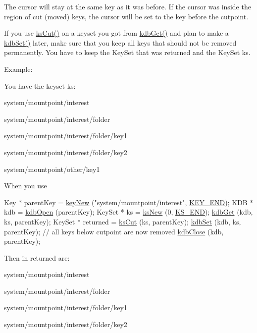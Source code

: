 The cursor will stay at the same key as it was before. If the cursor was inside the region of cut (moved) keys, the cursor will be set to the key before the cutpoint.

If you use \hyperlink{group__keyset_ga6b00cf82b59af4d883a9bad6cf4a4a4a}{ks\+Cut()} on a keyset you got from \hyperlink{group__kdb_ga28e385fd9cb7ccfe0b2f1ed2f62453a1}{kdb\+Get()} and plan to make a \hyperlink{group__kdb_ga11436b058408f83d303ca5e996832bcf}{kdb\+Set()} later, make sure that you keep all keys that should not be removed permanently. You have to keep the Key\+Set that was returned and the Key\+Set {\ttfamily ks}.

\begin{DoxyParagraph}{Example\+:}

\end{DoxyParagraph}
You have the keyset {\ttfamily ks\+:} 
\begin{DoxyItemize}
\item {\ttfamily system/mountpoint/interest} 
\item {\ttfamily system/mountpoint/interest/folder} 
\item {\ttfamily system/mountpoint/interest/folder/key1} 
\item {\ttfamily system/mountpoint/interest/folder/key2} 
\item {\ttfamily system/mountpoint/other/key1} 
\end{DoxyItemize}

When you use 
\begin{DoxyCodeInclude}
        Key * parentKey = \hyperlink{group__key_gad23c65b44bf48d773759e1f9a4d43b89}{keyNew} (\textcolor{stringliteral}{"system/mountpoint/interest"}, \hyperlink{group__key_gga91fb3178848bd682000958089abbaf40aa8adb6fcb92dec58fb19410eacfdd403}{KEY\_END});
        KDB * kdb = \hyperlink{group__kdb_ga6808defe5870f328dd17910aacbdc6ca}{kdbOpen} (parentKey);
        KeySet * ks = \hyperlink{group__keyset_ga671e1aaee3ae9dc13b4834a4ddbd2c3c}{ksNew} (0, \hyperlink{kdbenum_8c_a7a28fce3773b2c873c94ac80b8b4cd54}{KS\_END});
        \hyperlink{group__kdb_ga28e385fd9cb7ccfe0b2f1ed2f62453a1}{kdbGet} (kdb, ks, parentKey);
        KeySet * returned = \hyperlink{group__keyset_ga6b00cf82b59af4d883a9bad6cf4a4a4a}{ksCut} (ks, parentKey);
        \hyperlink{group__kdb_ga11436b058408f83d303ca5e996832bcf}{kdbSet} (kdb, ks, parentKey); \textcolor{comment}{// all keys below cutpoint are now removed}
        \hyperlink{group__kdb_gadb54dc9fda17ee07deb9444df745c96f}{kdbClose} (kdb, parentKey);
\end{DoxyCodeInclude}
 Then in {\ttfamily returned} are\+:
\begin{DoxyItemize}
\item {\ttfamily system/mountpoint/interest} 
\item {\ttfamily system/mountpoint/interest/folder} 
\item {\ttfamily system/mountpoint/interest/folder/key1} 
\item {\ttfamily system/mountpoint/interest/folder/key2} 
\end{DoxyItemize}

